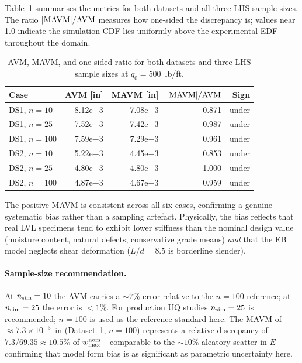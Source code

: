 \documentclass[10pt,twocolumn]{article}
\begin{document}
Table~\ref{tab:avm_all} summarises the metrics for both datasets and
all three LHS sample sizes.
The ratio $|{\rm MAVM}|/{\rm AVM}$ measures how one-sided the discrepancy is;
values near 1.0 indicate the simulation CDF lies uniformly above the
experimental EDF throughout the domain.

\begin{table}[ht]
\centering
\caption{AVM, MAVM, and one-sided ratio for both datasets
  and three LHS sample sizes at $q_0=500$~lb/ft.}
\label{tab:avm_all}
\footnotesize
\setlength{\tabcolsep}{3pt}
\begin{tabular}{@{}lrrrr@{}}
\toprule
Case & AVM [in] & MAVM [in] & $|{\rm MAVM}|/{\rm AVM}$ & Sign\\
\midrule
DS1, $n=10$  & 8.12e$-$3 & 7.08e$-$3 & 0.871 & under\\
DS1, $n=25$  & 7.52e$-$3 & 7.42e$-$3 & 0.987 & under\\
DS1, $n=100$ & 7.59e$-$3 & 7.29e$-$3 & 0.961 & under\\
\midrule
DS2, $n=10$  & 5.22e$-$3 & 4.45e$-$3 & 0.853 & under\\
DS2, $n=25$  & 4.80e$-$3 & 4.80e$-$3 & 1.000 & under\\
DS2, $n=100$ & 4.87e$-$3 & 4.67e$-$3 & 0.959 & under\\
\bottomrule
\end{tabular}
\end{table}

The positive MAVM is consistent across all six cases, confirming a
genuine systematic bias rather than a sampling artefact.
Physically, the bias reflects that real LVL specimens tend to
exhibit lower stiffness than the nominal design value
(moisture content, natural defects, conservative grade means)
\emph{and} that the EB model neglects shear deformation
($L/d=8.5$ is borderline slender).

\paragraph{Sample-size recommendation.}
At $n_{\rm sim}=10$ the AVM carries a $\sim7\%$ error relative to the
$n=100$ reference; at $n_{\rm sim}=25$ the error is $<1\%$.
For production UQ studies $n_{\rm sim}=25$ is recommended; $n=100$ is
used as the reference standard here.
The MAVM of $\approx7.3\times10^{-3}$~in (Dataset~1, $n=100$)
represents a relative discrepancy of
$7.3/69.35\approx10.5\%$ of $w_{\rm max}^{\rm nom}$---comparable
to the $\sim10\%$ aleatory scatter in $E$---confirming that model
form bias is as significant as parametric uncertainty here.
\end{document}

